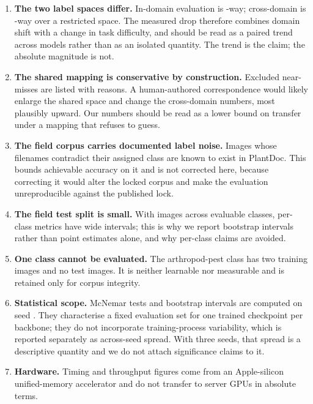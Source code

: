 \documentclass[runningheads]{llncs}
\begin{document}
\begin{enumerate}
\item \textbf{The two label spaces differ.} In-domain evaluation is
\NPvClasses{}-way; cross-domain is \NSharedClasses{}-way over a restricted
space. The measured drop therefore combines domain shift with a change in task
difficulty, and should be read as a paired trend across models rather than as an
isolated quantity. The trend is the claim; the absolute magnitude is not.

\item \textbf{The shared mapping is conservative by construction.} Excluded
near-misses are listed with reasons. A human-authored correspondence would
likely enlarge the shared space and change the cross-domain numbers, most
plausibly upward. Our numbers should be read as a lower bound on transfer under
a mapping that refuses to guess.

\item \textbf{The field corpus carries documented label noise.} Images whose
filenames contradict their assigned class are known to exist in PlantDoc. This
bounds achievable accuracy on it and is not corrected here, because correcting
it would alter the locked corpus and make the evaluation unreproducible against
the published lock.

\item \textbf{The field test split is small.} With \NPdcTest{} images across
\NPdcTestClasses{} evaluable classes, per-class metrics have wide intervals; this is why we
report bootstrap intervals rather than point estimates alone, and why per-class
claims are avoided.

\item \textbf{One class cannot be evaluated.} The arthropod-pest class has two
training images and no test images. It is neither learnable nor measurable and
is retained only for corpus integrity.

\item \textbf{Statistical scope.} McNemar tests and bootstrap intervals are
computed on seed \SigSeed{}. They characterise a fixed evaluation set for one
trained checkpoint per backbone; they do not incorporate training-process
variability, which is reported separately as across-seed spread. With three
seeds, that spread is a descriptive quantity and we do not attach significance
claims to it.

\item \textbf{Hardware.} Timing and throughput figures come from an
Apple-silicon unified-memory accelerator and do not transfer to server GPUs in
absolute terms.


\end{enumerate}
\end{document}

